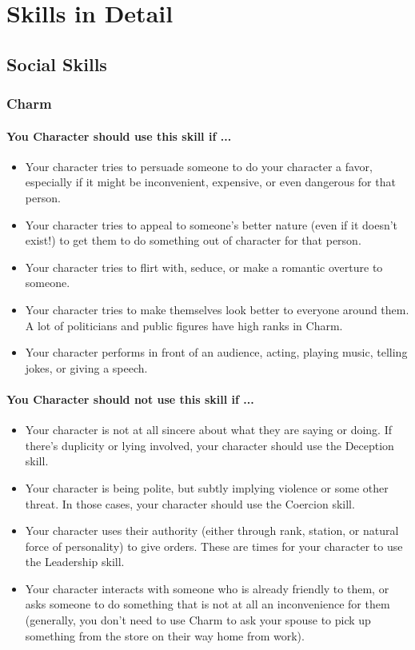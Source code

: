 \section{Skills in Detail}

\subsection{Social Skills}
\begin{multicols}{2}
    \subsubsection{Charm}\label{skill:charm}
\paragraph{You Character should use this skill if ...}
\begin{itemize}
    \item Your character tries to persuade someone to do your character a favor,
      especially if it might be inconvenient, expensive, or even dangerous for that
      person.
    \item Your character tries to appeal to someone's better nature (even if it doesn't
      exist!) to get them to do something out of character for that person.
    \item Your character tries to flirt with, seduce, or make a romantic overture to
      someone.
    \item Your character tries to make themselves look better to everyone around
      them. A lot of politicians and public figures have high ranks in Charm.
    \item Your character performs in front of an audience, acting, playing music,
      telling jokes, or giving a speech.
\end{itemize}
\paragraph{You Character should not use this skill if ...}
\begin{itemize}
    \item Your character is not at all sincere about what they are saying or doing.
      If there’s duplicity or lying involved, your character should use the
      Deception skill.
    \item Your character is being polite, but subtly implying violence or some other
      threat. In those cases, your character should use the Coercion skill.
    \item Your character uses their authority (either through rank, station, or
      natural force of personality) to give orders. These are times for your
      character to use the Leadership skill.
    \item Your character interacts with someone who is already friendly to them,
      or asks someone to do something that is not at all an inconvenience for
      them (generally, you don’t need to use Charm to ask your spouse to pick up
      something from the store on their way home from work).
\end{itemize}


\end{multicols}
